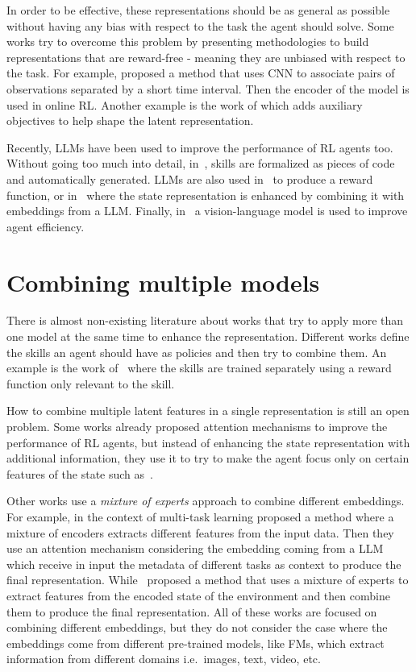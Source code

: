 In order to be effective, these representations should be as general as possible without having any bias with respect to the task the agent should solve.
Some works try to overcome this problem by presenting methodologies to build representations that are reward-free - meaning they are unbiased with respect to the task.
For example, \citet{stooke2021decoupling} proposed a method that uses CNN to associate pairs of observations separated by a short time interval.
Then the encoder of the model is used in online RL.
Another example is the work of \citet{lan2023bootstrapped} which adds auxiliary objectives to help shape the latent representation.

Recently, LLMs have been used to improve the performance of RL agents too.
Without going too much into detail, in~\citet{wang2023voyager}, skills are formalized as pieces of code and automatically generated.
LLMs are also used in~\citet{yu2023language} to produce a reward function, or in~\citet{lifshitz2024steve} where the state representation is enhanced by combining it with embeddings from a LLM\@.
Finally, in~\citet{brohan2023rt} a vision-language model is used to improve agent efficiency.




\section{Combining multiple models}\label{sec:fm_rl_combination}
There is almost non-existing literature about works that try to apply more than one model at the same time to enhance the representation.
Different works define the skills an agent should have as policies and then try to combine them.
An example is the work of~\citet{sahni2017learning} where the skills are trained separately using a reward function only relevant to the skill.

How to combine multiple latent features in a single representation is still an open problem.
Some works already proposed attention mechanisms to improve the performance of RL agents, but instead of enhancing the state representation with additional information, they use it to try to make the agent focus only on certain features of the state such as~\citet{bramlage2022generalized, blakeman2022selective}.

Other works use a \textit{mixture of experts} approach to combine different embeddings.
For example, in the context of multi-task learning \citet{sodhani2021multi} proposed a method where a mixture of encoders extracts different features from the input data.
Then they use an attention mechanism considering the embedding coming from a LLM which receive in input the metadata of different tasks as context to produce the final representation.
While~\citet{obando2024mixtures} proposed a method that uses a mixture of experts to extract features from the encoded state of the environment and then combine them to produce the final representation.
All of these works are focused on combining different embeddings, but they do not consider the case where the embeddings come from different pre-trained models, like FMs, which extract information from different domains i.e.\ images, text, video, etc.

